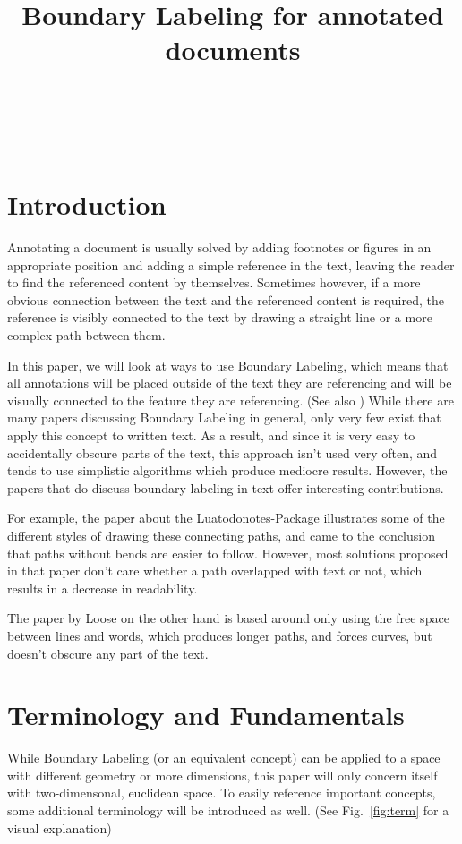 \documentclass[11pt,a4paper]{article}
\title{Boundary Labeling for annotated documents}%
\author{
 \authorname{Jakob Klinger} \\
 \studentnumber{1125755} \\
 \curriculum{033 534} \\
 \email{e1125755@student.tuwien.ac.at}
}
\begin{document}
\maketitle


\section{Introduction}
Annotating a document is usually solved by adding footnotes or figures in an appropriate position and adding a simple reference in the text, leaving the reader to find the referenced content by themselves. Sometimes however, if a more obvious connection between the text and the referenced content is required, the reference is visibly connected to the text by drawing a straight line or a more complex path between them.

In this paper, we will look at ways to use Boundary Labeling, which means that all annotations will be placed outside of the text they are referencing and will be visually connected to the feature they are referencing. (See also \cite{Bekos2007}) While there are many papers discussing Boundary Labeling in general, only very few exist that apply this concept to written text. As a result, and since it is very easy to accidentally obscure parts of the text, this approach isn't used very often, and tends to use simplistic algorithms which produce mediocre results.
However, the papers that do discuss boundary labeling in text offer interesting contributions.

For example, the paper about the Luatodonotes-Package\cite{Kindermann2014} illustrates some of the different styles of drawing these connecting paths, and came to the conclusion that paths without bends are easier to follow. %
However, most solutions proposed in that paper don't care whether a path overlapped with text or not, which results in a decrease in readability.

The paper by Loose\cite{Loose2015} on the other hand is based around only using the free space between lines and words, which produces longer paths, and forces curves, but doesn't obscure any part of the text.



\section{Terminology and Fundamentals} %
While Boundary Labeling (or an equivalent concept) can be applied to a space with different geometry or more dimensions, this paper will only concern itself with two-dimensonal, euclidean space.
To easily reference important concepts, some additional terminology will be introduced as well. (See Fig.~\ref{fig:term} for a visual explanation)%
\end{document}
